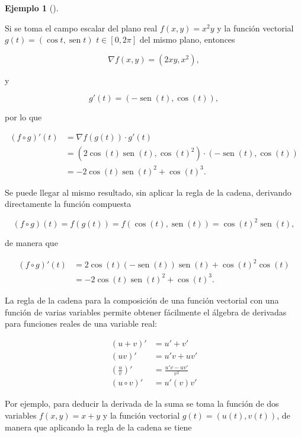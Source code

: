 \documentclass[
  a4paper,
]{scrreport}
\theoremstyle{definition}
\theoremstyle{plain}
\theoremstyle{plain}
\theoremstyle{definition}
\theoremstyle{definition}
\newtheorem{example}{Ejemplo}[chapter]
\theoremstyle{plain}
\theoremstyle{remark}
\begin{document}
\begin{example}[]\protect\hypertarget{exm-regla-cadena}{}\label{exm-regla-cadena}

Si se toma el campo escalar del plano real \(f(x,y)=x^2y\) y la función
vectorial \(g(t)=(\cos t,\operatorname{sen} t)\) \(t\in [0,2\pi]\) del
mismo plano, entonces

\[
\nabla f(x,y) = (2xy, x^2),
\]

y

\[
g'(t) = (-\operatorname{sen}(t), \cos(t)),
\]

por lo que

\begin{align*}
(f\circ g)'(t) 
&= \nabla f(g(t))\cdot g'(t) \\
&= (2\cos(t)\operatorname{sen}(t),\cos(t)^2)\cdot (-\operatorname{sen}(t),\cos(t)) \\
&= -2\cos(t)\operatorname{sen}(t)^2+\cos(t)^3.
\end{align*}

Se puede llegar al mismo resultado, sin aplicar la regla de la cadena,
derivando directamente la función compuesta

\[
(f\circ g)(t) = f(g(t)) = f(\cos(t), \operatorname{sen}(t)) = \cos(t)^2\operatorname{sen}(t),
\]

de manera que

\begin{align*}
(f\circ g)'(t) 
&= 2\cos(t)(-\operatorname{sen}(t))\operatorname{sen}(t)+\cos(t)^2 \cos(t)\\
&= -2\cos(t)\operatorname{sen}(t)^2+\cos(t)^3.
\end{align*}

\end{example}

La regla de la cadena para la composición de una función vectorial con
una función de varias variables permite obtener fácilmente el álgebra de
derivadas para funciones reales de una variable real:

\[
\begin{aligned}
(u+v)' &= u'+v'\\
(uv)' &= u'v+uv'\\
\left(\frac{u}{v}\right)' &= \frac{u'v-uv'}{v^2}\\
(u\circ v)' &= u'(v)v'
\end{aligned}
\]

Por ejemplo, para deducir la derivada de la suma se toma la función de
dos variables \(f(x,y)=x+y\) y la función vectorial
\(g(t)=(u(t),v(t))\), de manera que aplicando la regla de la cadena se
tiene
\end{document}
